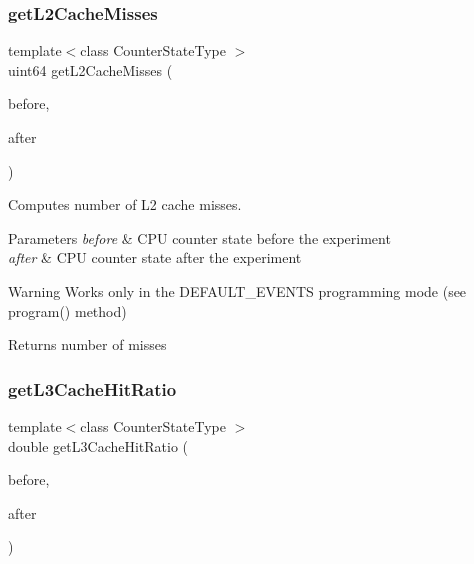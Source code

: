 \subsubsection{get\+L2\+Cache\+Misses}
{\footnotesize\ttfamily template$<$class Counter\+State\+Type $>$ \\
uint64 get\+L2\+Cache\+Misses (\begin{DoxyParamCaption}\item[{const Counter\+State\+Type \&}]{before,  }\item[{const Counter\+State\+Type \&}]{after }\end{DoxyParamCaption})\hspace{0.3cm}{\ttfamily [friend]}}



Computes number of L2 cache misses. 


\begin{DoxyParams}{Parameters}
{\em before} & C\+PU counter state before the experiment \\
\hline
{\em after} & C\+PU counter state after the experiment \\
\hline
\end{DoxyParams}
\begin{DoxyWarning}{Warning}
Works only in the D\+E\+F\+A\+U\+L\+T\+\_\+\+E\+V\+E\+N\+TS programming mode (see program() method) 
\end{DoxyWarning}
\begin{DoxyReturn}{Returns}
number of misses 
\end{DoxyReturn}
\mbox{\label{classBasicCounterState_a7b03f0cd02862716d717e897032b7885}} 
\subsubsection{get\+L3\+Cache\+Hit\+Ratio}
{\footnotesize\ttfamily template$<$class Counter\+State\+Type $>$ \\
double get\+L3\+Cache\+Hit\+Ratio (\begin{DoxyParamCaption}\item[{const Counter\+State\+Type \&}]{before,  }\item[{const Counter\+State\+Type \&}]{after }\end{DoxyParamCaption})\hspace{0.3cm}{\ttfamily [friend]}}



